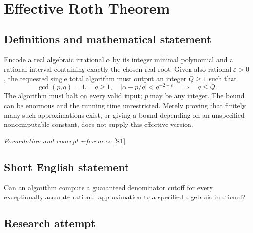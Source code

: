 \documentclass[11pt,a4paper]{article}
\newcommand{\eps}{\varepsilon}
\newcommand{\sref}[2]{\hyperlink{source:#1:#2}{[S#2]}}
\newif\ifshowcatalogue
\newcommand{\cataloguescope}[1]{\ifshowcatalogue
 \paragraph{Exact scope in the supplied catalogue.}
 \begin{quote}\small #1\end{quote}\fi}
\begin{document}
\setcounter{section}{207}
\clearpage
\section{\texorpdfstring{Effective Roth Theorem}{Effective Roth Theorem}}\label{208}
\subsection{Definitions and mathematical statement}
Encode a real algebraic irrational $\alpha$ by its integer minimal polynomial and a rational interval containing exactly the chosen real root. Given also rational $\eps>0$, the requested single total algorithm must output an integer $Q\ge1$ such that
\[
 \gcd(p,q)=1,\quad q\ge1,\quad
 |\alpha-p/q|<q^{-2-\eps}\quad\Longrightarrow\quad q\le Q.
\]
The algorithm must halt on every valid input; $p$ may be any integer. The bound can be enormous and the running time unrestricted. Merely proving that finitely many such approximations exist, or giving a bound depending on an unspecified noncomputable constant, does not supply this effective version.
\par\smallskip\textit{Formulation and concept references:} \sref{208}{1}.
\cataloguescope{There exists one total computable algorithm which, given a real algebraic irrational alpha by its integer minimal polynomial and a rational isolating interval, and a positive rational epsilon, returns an integer Q>=1 such that every reduced rational p/q, with p an integer and q>=1 an integer, satisfying |alpha-p/q|<q\textasciicircum{}(-2-epsilon) has q<=Q. The algorithm must halt with this guarantee on every valid input. No time, space, practical-size or software-implementation requirement is imposed.}
\subsection{Short English statement}
Can an algorithm compute a guaranteed denominator cutoff for every exceptionally accurate rational approximation to a specified algebraic irrational?
\subsection{Research attempt}
\end{document}
